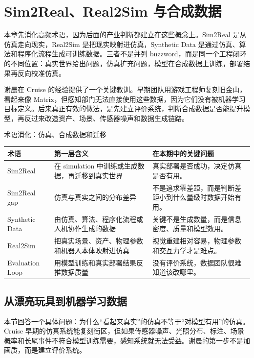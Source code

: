 \section{Sim2Real、Real2Sim 与合成数据}

本章先消化高频术语，因为后面的产业判断都建立在这些概念上。Sim2Real 是从仿真走向现实，Real2Sim 是把现实映射进仿真，Synthetic Data 是通过仿真、算法和程序化流程生成可训练数据。三者不是并列 buzzword，而是同一个工程闭环的不同位置：真实世界给出问题，仿真扩充问题，模型在合成数据上训练，部署结果再反向校准仿真。

谢晨在 Cruise 的经验提供了一个关键教训。早期团队用游戏工程师复刻旧金山，看起来像 Matrix，但感知部门无法直接使用这些数据，因为它们没有被机器学习目标定义。后来真正有效的做法，是先建立评价系统，判断合成数据是否能提升模型，再反过来改造资产、场景、传感器噪声和数据生成链路。

\begin{knowledgebox}{术语消化：仿真、合成数据和迁移}
\begin{tabularx}{\textwidth}{p{}p{}X}
\toprule
术语 & 第一层含义 & 在本期中的关键问题 \\
\midrule
Sim2Real & 在 simulation 中训练或生成数据，再迁移到真实世界 & 真实部署是否成功，决定仿真是否有用。 \\
Sim2Real gap & 仿真与真实之间的分布差异 & 不是追求零差距，而是判断差距小到什么量级时数据开始有用。 \\
Synthetic Data & 由仿真、算法、程序化流程或人机协作生成的数据 & 关键不是生成数量，而是信息密度、质量和模型效用。 \\
Real2Sim & 把真实场景、资产、物理参数和机器人本体映射进仿真 & 视觉重建相对容易，物理参数和交互力学才是难点。 \\
Evaluation Loop & 用模型训练和真实部署结果反推数据质量 & 没有评价系统，数据团队很难知道该改哪里。 \\
\bottomrule
\end{tabularx}
\end{knowledgebox}

\subsection{从漂亮玩具到机器学习数据}

本节回答一个具体问题：为什么“看起来真实”的仿真不等于“对模型有用”的仿真。Cruise 早期的仿真系统能复刻街区，但如果传感器噪声、光照分布、标注、场景概率和长尾事件不符合模型训练需要，感知系统就无法受益。谢晨的第一步不是加画质，而是建立评价系统。

